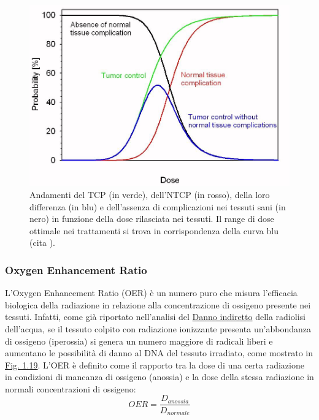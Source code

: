 \documentclass[12pt,a4paper,twoside]{report}
\begin{document}
	\begin{figure}[H]
		\centering
		\includegraphics[width=0.9\linewidth]{images/tcp.jpg}
		\caption{Andamenti del TCP (in verde), dell'NTCP (in rosso), della loro differenza (in blu) e dell'assenza di complicazioni nei tessuti sani (in nero) in funzione della dose rilasciata nei tessuti. Il range di dose ottimale nei trattamenti si trova in corrispondenza della curva blu (cita
			).}
		\label{fig:tcp}
	\end{figure}

	\subsubsection{Oxygen Enhancement Ratio}\label{par:oer}
	L'Oxygen Enhancement Ratio (OER) è un numero puro che misura l'efficacia biologica della radiazione in relazione alla concentrazione di ossigeno presente nei tessuti. Infatti, come già riportato nell'analisi del \hyperref[par:danno_indiretto]{Danno indiretto} della radiolisi dell'acqua, se il tessuto colpito con radiazione ionizzante presenta un'abbondanza di ossigeno (iperossia) si genera un numero maggiore di radicali liberi e aumentano le possibilità di danno al DNA del tessuto irradiato, come mostrato in \hyperref[fig:oer_survival]{Fig. 1.19}. L'OER è definito come il rapporto tra la dose di una certa radiazione in condizioni di mancanza di ossigeno (anossia) e la dose della stessa radiazione in normali concentrazioni di ossigeno:
	\begin{equation}
		OER=\frac{D_{anossia}}{D_{normale}}
		\label{eq:oer}
	\end{equation}
	
\end{document}
